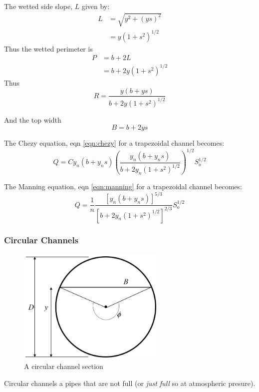 \documentclass[a4paper, 12pt, british]{article} %
\numberwithin{equation}{section}
\numberwithin{figure}{section}
\numberwithin{table}{section}
\begin{document}
	The wetted side slope, $L$ given by:
	\begin{align*}
	L &= \sqrt{y^2 + (ys)^2} \\
	&= y(1+s^2)^{1/2}
	\end{align*}
	Thus the wetted perimeter is
	\begin{align*}
	P &= b+ 2 L \\
	&= b + 2 y(1+s^2)^{1/2}
	\end{align*}
	Thus 
	\begin{equation*}
	R = \frac{y(b+ys)}{b+2y(1+s^2)^{1/2}}
	\end{equation*}
	
	And the top width
	\begin{equation*}
	B = b + 2ys
	\end{equation*}
	
	The Chezy equation, eqn \ref{eqn:chezy} for a trapezoidal channel becomes:
	\begin{equation}
	Q = C y_n(b+y_ns) \left( \frac{y_n(b+y_ns)}{b+2y_n(1+s^2)^{1/2}}\right)^{1/2}S_o^{1/2}
	\label{eqn:chezy_trap}
	\end{equation}
	
	The Manning equation, eqn \ref{eqn:manning} for a trapezoidal channel becomes:
	\begin{equation}
	Q = \frac{1}{n} \frac{[y_n(b+y_ns)]^{5/3}}{[b+2y_n(1+s^2)^{1/2}]^{2/3}} S_o^{1/2} \label{eqn:manning_trap}
	\end{equation}
	
	\subsubsection*{Circular Channels}
	\begin{figure}[H]
		\centering
		\includegraphics[width=7cm]{./images/section_circ.png}
		\caption{A circular channel section}
		\label{fig:section_circ}
	\end{figure}
	Circular channels a pipes that are not full (or \textit{just full} so at atmospheric presure).
	
\end{document}
